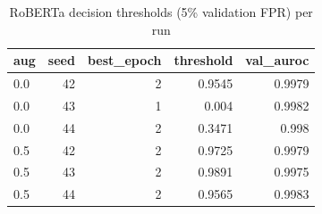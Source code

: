 \begin{table}[!t]
\centering
\caption{RoBERTa decision thresholds (5\% validation FPR) per run}
\label{tab:roberta_thresholds}
\footnotesize
\begin{tabular}{lrrrr}
\toprule
\textbf{aug} & \textbf{seed} & \textbf{best\_epoch} & \textbf{threshold} & \textbf{val\_auroc} \\
\midrule
0.0 & 42 & 2 & 0.9545 & 0.9979 \\
0.0 & 43 & 1 & 0.004 & 0.9982 \\
0.0 & 44 & 2 & 0.3471 & 0.998 \\
0.5 & 42 & 2 & 0.9725 & 0.9979 \\
0.5 & 43 & 2 & 0.9891 & 0.9975 \\
0.5 & 44 & 2 & 0.9565 & 0.9983 \\
\bottomrule
\end{tabular}
\end{table}
